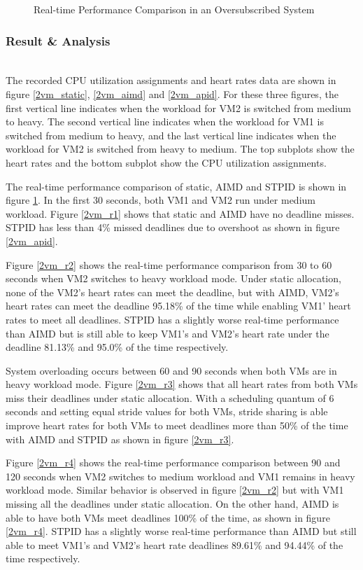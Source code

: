 \begin{figure}[ht!]
\captionsetup{justification=centering}
\caption{Real-time Performance Comparison in an Oversubscribed System}
\label{2vm_fps}
\end{figure}

\subsubsection*{Result \& Analysis}\hfill\\
  \indent The recorded CPU utilization assignments and heart rates data are shown in figure \ref{2vm_static}, \ref{2vm_aimd} and \ref{2vm_apid}. For these three figures, the first vertical line indicates when the workload for VM2 is switched from medium to heavy. The second vertical line indicates when the workload for VM1 is switched from medium to heavy, and the last vertical line indicates when the workload for VM2 is switched from heavy to medium. The top subplots show the heart rates and the bottom subplot show the CPU utilization assignments.
  
The real-time performance comparison of static, AIMD and STPID is shown in figure \ref{2vm_fps}. In the first 30 seconds, both VM1 and VM2 run under medium workload. Figure \ref{2vm_r1} shows that static and AIMD have no deadline misses. STPID has less than 4\% missed deadlines due to overshoot as shown in figure \ref{2vm_apid}.

Figure \ref{2vm_r2} shows the real-time performance comparison from 30 to 60 seconds when VM2 switches to heavy workload mode. Under static allocation, none of the VM2's heart rates can meet the deadline, but with AIMD, VM2's heart rates can meet the deadline 95.18\% of the time while enabling VM1' heart rates to meet all deadlines. STPID has a slightly worse real-time performance than AIMD but is still able to keep VM1's and VM2's heart rate under the deadline 81.13\% and 95.0\% of the time respectively.

System overloading occurs between 60 and 90 seconds when both VMs are in heavy workload mode. Figure \ref{2vm_r3} shows that all heart rates from both VMs miss their deadlines under static allocation. With a scheduling quantum of 6 seconds and setting equal stride values for both VMs, stride sharing is able improve heart rates for both VMs to meet deadlines more than 50\% of the time with AIMD and STPID as shown in figure \ref{2vm_r3}.

Figure \ref{2vm_r4} shows the real-time performance comparison between 90 and 120 seconds when VM2 switches to medium workload and VM1 remains in heavy workload mode. Similar behavior is observed in figure \ref{2vm_r2} but with VM1 missing all the deadlines under static allocation. On the other hand, AIMD is able to have both VMs meet deadlines 100\% of the time, as shown in figure \ref{2vm_r4}. STPID has a slightly worse real-time performance than AIMD but still able to meet VM1's and VM2's heart rate deadlines 89.61\% and 94.44\% of the time respectively.

